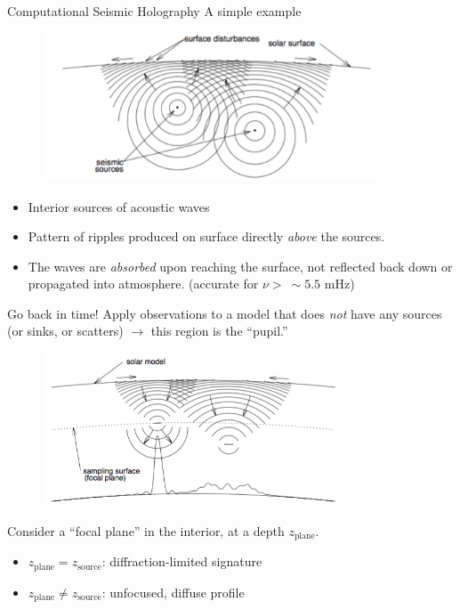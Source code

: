 \documentclass{beamer}
\begin{document}
\begin{frame}{Computational Seismic Holography}
    A simple example
    \begin{figure}
        \includegraphics[width=0.9\textwidth]{fig_1.pdf}
    \end{figure}
    \begin{itemize}
        \item Interior sources of acoustic waves
        \item Pattern of ripples produced on surface
            directly \emph{above} the sources.
        \item The waves are \emph{absorbed} upon reaching the surface,
            not reflected back down or propagated into atmosphere.
            (accurate for $\nu >\ \sim 5.5$ mHz)
    \end{itemize}
\end{frame}

\begin{frame}{Go back in time!}
    Apply observations to a model that does \emph{not} have any sources
    (or sinks, or scatters) $\rightarrow$ this region is the ``pupil.''
    \begin{figure}
        \includegraphics[width=0.8\textwidth]{fig_2.png}
    \end{figure}
    Consider a ``focal plane'' in the interior, at a depth
    $z_{\textrm{plane}}$.
    \begin{itemize}
        \item $z_{\textrm{plane}} = z_{\textrm{source}}$:
            diffraction-limited signature
        \item $z_{\textrm{plane}} \neq z_{\textrm{source}}$:
            unfocused, diffuse profile
    \end{itemize}
\end{frame}
\end{document}
